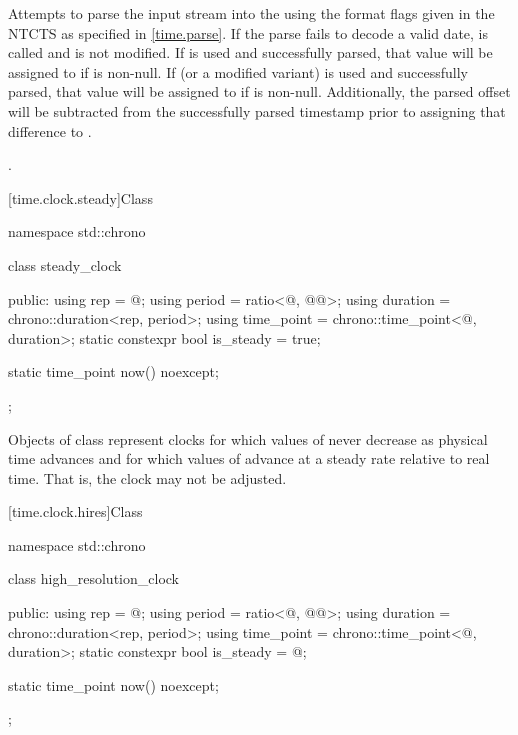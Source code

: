 \begin{itemdescr}
\pnum
\effects
Attempts to parse the input stream 
into the   using
the format flags given in the NTCTS 
as specified in \ref{time.parse}.
If the parse fails to decode a valid date,
 is called and
 is not modified.
If  is used and successfully parsed,
that value will be assigned to  if  is non-null.
If  (or a modified variant) is used and successfully parsed,
that value will be assigned to  if  is non-null.
Additionally, the parsed offset will be subtracted from
the successfully parsed timestamp prior to assigning that difference to .

\pnum
\returns
{}.
\end{itemdescr}

[time.clock.steady]{Class }
%

\begin{codeblock}
namespace std::chrono {
  class steady_clock {
  public:
    using rep        = @\unspec@;
    using period     = ratio<@\unspecnc@, @\unspec{}@>;
    using duration   = chrono::duration<rep, period>;
    using time_point = chrono::time_point<@\unspecnc@, duration>;
    static constexpr bool is_steady = true;

    static time_point now() noexcept;
  };
}
\end{codeblock}

\pnum
Objects of class  represent clocks for which values of 
never decrease as physical time advances and for which values of  advance at
a steady rate relative to real time. That is, the clock may not be adjusted.

[time.clock.hires]{Class }
%

\begin{codeblock}
namespace std::chrono {
  class high_resolution_clock {
  public:
    using rep        = @\unspec@;
    using period     = ratio<@\unspecnc@, @\unspec{}@>;
    using duration   = chrono::duration<rep, period>;
    using time_point = chrono::time_point<@\unspecnc@, duration>;
    static constexpr bool is_steady = @\unspec@;

    static time_point now() noexcept;
  };
}
\end{codeblock}

